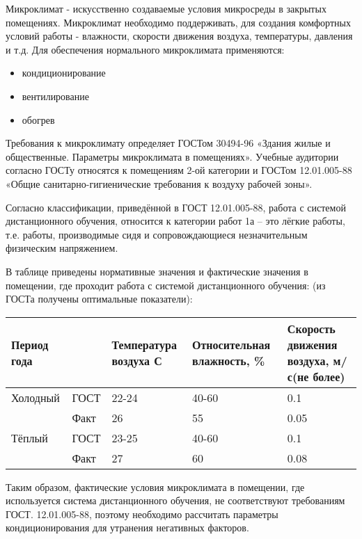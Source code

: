 Микроклимат - искусственно создаваемые условия микросреды в закрытых помещениях.
Микроклимат необходимо поддерживать, для создания комфорт\-ных условий работы - влажности, скорости движения воздуха, температуры, давления и т.д.
Для обеспечения нормального микроклимата применяются:

\begin{itemize}
\item кондиционирование
\item вентилирование
\item обогрев
\end{itemize}

Требования к микроклимату определяет ГОСТом 30494-96 «Здания жилые и общест\-венные. Параметры микроклимата в помещениях». Учебные аудито\-рии согласно ГОСТу относятся к помещениям 2-ой категории и ГОСТом 12.01.005-88 «Общие санитарно-гигиенические требования к воздуху рабочей зоны».

Согласно классификации, приведённой в ГОСТ 12.01.005-88, работа с сис\-темой дистан\-ционного обучения, относится к категории работ 1а – это лёгкие работы, т.е. работы, производимые сидя и сопровождающиеся незначительным физическим напряжением.

В таблице приведены нормативные значения и фактические значения в помещении, где проходит работа с сис\-темой дистанционного обучения: (из ГОСТа получены оптимальные показатели):

\begin{table}[H]
\begin{center}
\begin{tabular}{|l|p{}|p{2.5cm}|p{3cm}|p{3cm}|}
\hline
Период года &  & Температура воздуха С & Относительная влажность, \% & Скорость движения воздуха, м/с(не более)\\
\hline
Холодный & ГОСТ & 22-24 & 40-60 & 0.1\\
 & Факт & 26 & 55 & 0.05\\
\hline
Тёплый & ГОСТ & 23-25 & 40-60 & 0.1\\
 & Факт & 27 & 60 & 0.08\\
\hline
\end{tabular}
\end{center}
\end{table}

Таким образом, фактические условия микроклимата в помещении, где используется система дистанционного обучения, не соответствуют требованиям ГОСТ. 12.01.005-88, поэтому необходимо рассчитать параметры кондициониро\-вания для утранения негативных факторов.

